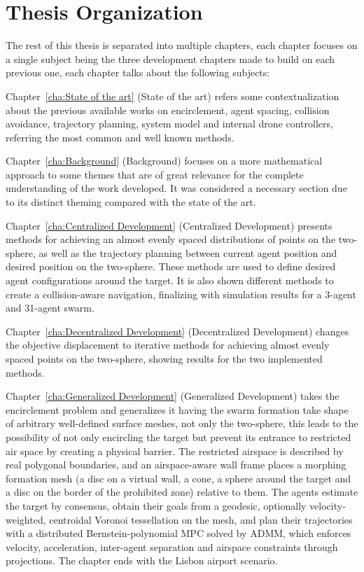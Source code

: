 \section{Thesis Organization} \label{sec.1:Report organization}

The rest of this thesis is separated into multiple chapters, each chapter focuses on a single subject being the three development chapters made to build on each previous one, each chapter talks about the following subjects:

Chapter~\ref{cha:State of the art} (State of the art) refers some contextualization about the previous available works on encirclement, agent spacing, collision avoidance, trajectory planning, system model and internal drone controllers, referring the most common and well known methods.

Chapter~\ref{cha:Background} (Background) focuses on a more mathematical approach to some themes that are of great relevance for the complete understanding of the work developed. It was considered a necessary section due to its distinct theming compared with the state of the art.

Chapter~\ref{cha:Centralized Development} (Centralized Development) presents methods for achieving an almost evenly spaced distributions of points on the two-sphere, as well as the trajectory planning between current agent position and desired position on the two-sphere. These methods are used to define desired agent configurations around the target. It is also shown different methods to create a collision-aware navigation, finalizing with simulation results for a 3-agent and 31-agent swarm.

Chapter~\ref{cha:Decentralized Development} (Decentralized Development) changes the objective displacement to iterative methods for achieving almost evenly spaced points on the two-sphere, showing results for the two implemented methods.

Chapter~\ref{cha:Generalized Development} (Generalized Development) takes the encirclement problem and generalizes it having the swarm formation take shape of arbitrary well-defined surface meshes, not only the two-sphere, this leads to the possibility of not only encircling the target but prevent its entrance to restricted air space by creating a physical barrier. The restricted airspace is described by real polygonal boundaries, and an airspace-aware wall frame places a morphing formation mesh (a disc on a virtual wall, a cone, a sphere around the target and a disc on the border of the prohibited zone) relative to them. The agents estimate the target by consensus, obtain their goals from a geodesic, optionally velocity-weighted, centroidal Voronoi tessellation on the mesh, and plan their trajectories with a distributed Bernstein-polynomial \gls{MPC} solved by \gls{ADMM}, which enforces velocity, acceleration, inter-agent separation and airspace constraints through projections. The chapter ends with the Lisbon airport scenario.

